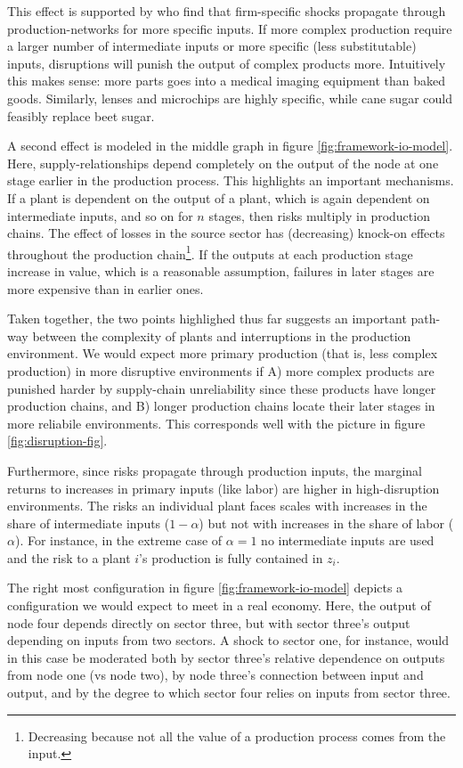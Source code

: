 \documentclass[11pt]{article}
\begin{document}
This effect is supported by \cite{barrot_input_2016} who find that firm-specific shocks propagate through production-networks for more specific inputs. If more complex production require a larger number of intermediate inputs or more specific (less substitutable) inputs, disruptions will punish the output of complex products more. Intuitively this makes sense: more parts goes into a medical imaging equipment than baked goods. Similarly, lenses and microchips are highly specific, while cane sugar could feasibly replace beet sugar.

A second effect is modeled in the middle graph in figure \ref{fig:framework-io-model}. Here, supply-relationships depend completely on the output of the node at one stage earlier in the production process. This highlights an important mechanisms. If a plant is dependent on the output of a plant, which is again dependent on intermediate inputs, and so on for \(n\) stages, then risks multiply in production chains. The effect of losses in the source sector has (decreasing) knock-on effects throughout the production chain\footnote{Decreasing because not all the value of a production process comes from the input.}. If the outputs at each production stage increase in value, which is a reasonable assumption, failures in later stages are more expensive than in earlier ones.

Taken together, the two points highlighed thus far suggests an important path-way between the complexity of plants and interruptions in the production environment.  We would expect more primary production (that is, less complex production) in more disruptive environments if A) more complex products are punished harder by supply-chain unreliability since these products have longer production chains, and B) longer production chains locate their later stages in more reliabile environments. This corresponds well with the picture in figure \ref{fig:disruption-fig}. 

Furthermore, since risks propagate through production inputs, the marginal returns to increases in primary inputs (like labor) are higher in high-disruption environments. The risks an individual plant faces scales with increases in the share of intermediate inputs (\(1 - \alpha\)) but not with increases in the share of labor (\(\alpha\)). For instance, in the extreme case of \(\alpha = 1\) no intermediate inputs are used and the risk to a plant \(i\)'s production is fully contained in \(z_i\). 

The right most configuration in figure \ref{fig:framework-io-model} depicts a configuration we would expect to meet in a real economy. Here, the output of node four depends directly on sector three, but with sector three's output depending on inputs from two sectors. A shock to sector one, for instance, would in this case be moderated both by sector three's relative dependence on outputs from node one (vs node two), by node three's connection between input and output, and by the degree to which sector four relies on inputs from sector three.
\end{document}
